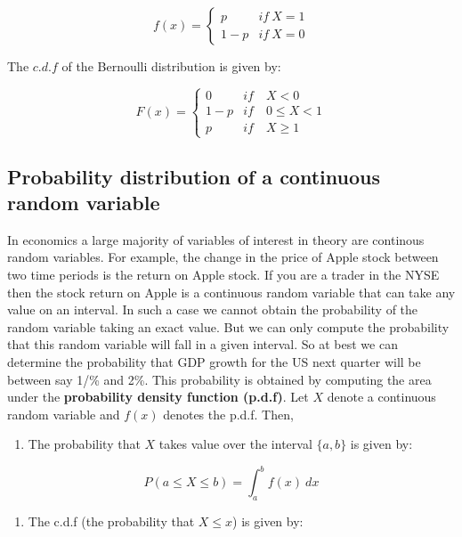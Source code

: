 \documentclass[]{book}
\providecommand{\tightlist}{%
  \setlength{\itemsep}{0pt}\setlength{\parskip}{0pt}}
\theoremstyle{definition}
\theoremstyle{definition}
\theoremstyle{definition}
\theoremstyle{remark}
\begin{document}
\[f(x)=\begin{cases}
    p & if \ X=1\\
    1-p & if \ X=0
     \end{cases}\]

The \(c.d.f\) of the Bernoulli distribution is given by:

\[F(x)=\begin{cases}
    0 & if \quad X < 0\\
    1-p & if \quad 0\leq X<1\\
    p & if \quad  X\geq 1
     \end{cases}\]

\hypertarget{probability-distribution-of-a-continuous-random-variable}{%
\subsection{Probability distribution of a continuous random variable}\label{probability-distribution-of-a-continuous-random-variable}}

In economics a large majority of variables of interest in theory are continous random variables. For example, the change in the price of Apple stock between two time periods is the return on Apple stock. If you are a trader in the NYSE then the stock return on Apple is a continuous random variable that can take any value on an interval. In such a case we cannot obtain the probability of the random variable taking an exact value. But we can only compute the probability that this random variable will fall in a given interval. So at best we can determine the probability that GDP growth for the US next quarter will be between say 1/\% and 2\%. This probability is obtained by computing the area under the \textbf{probability density function (p.d.f)}. Let \(X\) denote a continuous random variable and \(f(x)\) denotes the p.d.f. Then,

\begin{enumerate}
\def\labelenumi{\arabic{enumi}.}
\tightlist
\item
  The probability that \(X\) takes value over the interval \(\{a,b\}\) is given by:
\end{enumerate}

\[P(a\leq X \leq b)=\int_a^bf(x) \ dx\]

\begin{enumerate}
\def\labelenumi{\arabic{enumi}.}
\setcounter{enumi}{1}
\tightlist
\item
  The c.d.f (the probability that \(X\leq x\)) is given by:
\end{enumerate}
\end{document}
